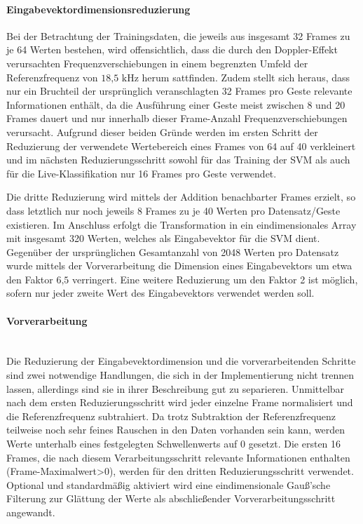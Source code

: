 \paragraph{Eingabevektordimensionsreduzierung}\label{sec:svm_reduce}$\;$ \\
Bei der Betrachtung der Trainingsdaten, die jeweils aus insgesamt 32 Frames zu je 64 Werten bestehen, wird offensichtlich, dass die durch den Doppler-Effekt verursachten Frequenzverschiebungen in einem begrenzten Umfeld der Referenzfrequenz von $18\text{,}5\text{ kHz}$ herum sattfinden.
Zudem stellt sich heraus, dass nur ein Bruchteil der ursprünglich veranschlagten 32 Frames pro Geste relevante Informationen enthält, da die Ausführung einer Geste meist zwischen 8 und 20 Frames dauert und nur innerhalb dieser Frame-Anzahl Frequenzverschiebungen verursacht.
Aufgrund dieser beiden Gründe werden im ersten Schritt der Reduzierung der verwendete Wertebereich eines Frames von 64 auf 40 verkleinert und im nächsten Reduzierungsschritt sowohl für das Training der \ac{SVM} als auch für die Live-Klassifikation nur 16 Frames pro Geste verwendet. 

Die dritte Reduzierung wird mittels der Addition benachbarter Frames erzielt, so dass letztlich nur noch jeweils 8 Frames zu je 40 Werten pro Datensatz/Geste existieren.
Im Anschluss erfolgt die Transformation in ein eindimensionales Array mit insgesamt 320 Werten, welches als Eingabevektor für die \ac{SVM} dient.
Gegenüber der ursprünglichen Gesamtanzahl von 2048 Werten pro Datensatz wurde mittels der Vorverarbeitung die Dimension eines Eingabevektors um etwa den Faktor $6\text{,}5$ verringert.
Eine weitere Reduzierung um den Faktor 2 ist möglich, sofern nur jeder zweite Wert des Eingabevektors verwendet werden soll.
\paragraph{Vorverarbeitung}\label{sec:svm_preprocess}$\;$ \\\\
Die Reduzierung der Eingabevektordimension und die vorverarbeitenden Schritte sind zwei notwendige Handlungen, die sich in der Implementierung nicht trennen lassen, allerdings sind sie in ihrer Beschreibung gut zu separieren.
Unmittelbar nach dem ersten Reduzierungsschritt wird jeder einzelne Frame normalisiert und die Referenzfrequenz subtrahiert.
Da trotz Subtraktion der Referenzfrequenz teilweise noch sehr feines Rauschen in den Daten vorhanden sein kann, werden Werte unterhalb eines festgelegten Schwellenwerts auf 0 gesetzt.
Die ersten 16 Frames, die nach diesem Verarbeitungsschritt relevante Informationen enthalten (Frame-Maximalwert\textgreater0), werden für den dritten Reduzierungsschritt verwendet.
Optional und standardmäßig aktiviert wird eine eindimensionale Gauß'sche Filterung zur Glättung der Werte als abschließender Vorverarbeitungsschritt angewandt.

